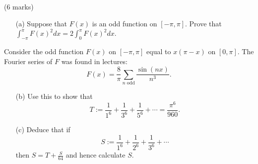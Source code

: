 \documentclass[12pt]{article}
\begin{document}
\vspace{0.5cm}

\begin{question}(6 marks)\\
\begin{enumerate}
\item[(a)] Suppose that $F(x)$ is an odd function on $[-\pi,\pi]$. Prove that $\int_{-\pi}^{\pi}F(x)^2dx=2\int_0^{\pi}F(x)^2dx$.
\end{enumerate}
Consider the odd function $F(x)$ on $[-\pi,\pi]$ equal to $x(\pi-x)$ on $[0,\pi]$. The Fourier series of $F$ was found in lectures:
\[F(x)=\frac{8}{\pi}\sum_{n\mbox{ odd}}\frac{\sin(nx)}{n^3}.\]
\begin{enumerate}
\item[(b)] Use this to show that
\[T:=\frac{1}{1^6}+\frac{1}{3^6}+\frac{1}{5^6}+\cdots=\frac{\pi^6}{960}.\]
\item[(c)] Deduce that if
\[S:=\frac{1}{1^6}+\frac{1}{2^6}+\frac{1}{3^6}+\cdots\]
then $S=T+\frac{S}{64}$ and hence calculate $S$.
\end{enumerate}
\end{question}

\end{document}
